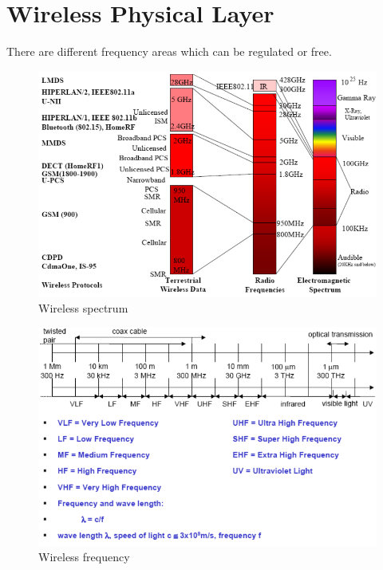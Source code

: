 \section{Wireless Physical Layer}
There are different frequency areas which can be regulated or free.\\
\begin{figure}[!h] 
    \centering 
    \includegraphics[scale = 0.4]{images/wireless-spectrum.png} 
    \caption{Wireless spectrum}
    \label{wireless-spectrum}
\end{figure}
\begin{figure}[!h] 
    \centering 
    \includegraphics[scale = 0.4]{images/wireless-frequency.png} 
    \caption{Wireless frequency}
    \label{wireless-frequency}
\end{figure}
\newpage
